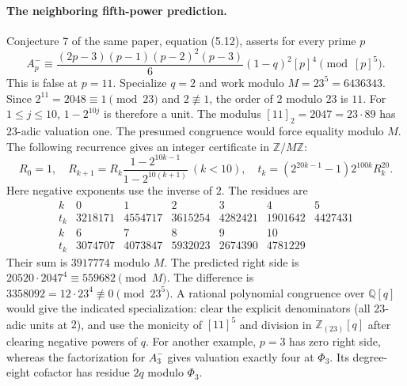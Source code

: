 \documentclass[11pt,a4paper]{article}
\numberwithin{equation}{section}
\begin{document}
\paragraph{The neighboring fifth-power prediction.}
Conjecture 7 of the same paper, equation (5.12), asserts for every prime $p$
\[
 A_p^-\equiv\frac{(2p-3)(p-1)(p-2)^2(p-3)}6(1-q)^2[p]^4
 \pmod{[p]^5}.
\]
This is false at $p=11$. Specialize $q=2$ and work modulo
$M=23^5=6436343$. Since $2^{11}=2048\equiv1\pmod{23}$ and $2\not\equiv1$,
the order of $2$ modulo $23$ is $11$. For $1\le j\le10$, $1-2^{10j}$ is
therefore a unit. The modulus $[11]_{2}=2047=23\cdot89$ has $23$-adic
valuation one. The presumed congruence would force equality modulo $M$.
The following recurrence gives an integer certificate in $\mathbb Z/M\mathbb Z$:
\[
 R_0=1,\quad R_{k+1}=R_k\frac{1-2^{10k-1}}{1-2^{10(k+1)}}\ (k<10),\quad t_k=(2^{20k-1}-1)2^{100k}R_k^{20}.
\]
Here negative exponents use the inverse of $2$. The residues are
\[
\begin{array}{c|rrrrrr}
k&0&1&2&3&4&5\\ \hline
t_k&3218171&4554717&3615254&4282421&1901642&4427431\\[2pt]
k&6&7&8&9&10&\\ \hline
t_k&3074707&4073847&5932023&2674390&4781229&
\end{array}
\]
Their sum is $3917774$ modulo $M$. The predicted right side is
$20520\cdot2047^4\equiv559682\pmod M$. The difference is
$3358092=12\cdot23^4\not\equiv0\pmod{23^5}$. A rational polynomial
congruence over $\mathbb Q[q]$ would give the indicated specialization:
clear the explicit denominators (all $23$-adic units at $2$), and use the
monicity of $[11]^5$ and division in $\mathbb Z_{(23)}[q]$ after clearing
negative powers of $q$. For another example, $p=3$ has zero right side,
whereas the factorization for $A_3^-$ gives valuation exactly four at
$\Phi_3$. Its degree-eight cofactor has residue $2q$ modulo $\Phi_3$.
\end{document}
